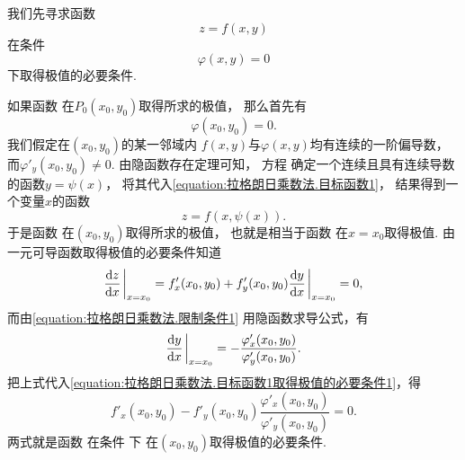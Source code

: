 我们先寻求函数
\begin{equation}\label{equation:拉格朗日乘数法.目标函数1}
	z=f(x,y)
\end{equation}
在条件
\begin{equation}\label{equation:拉格朗日乘数法.限制条件1}
	\varphi(x,y)=0
\end{equation}
下取得极值的必要条件.

如果函数 
在\(P_0(x_0,y_0)\)取得所求的极值，
那么首先有
\begin{equation}\label{equation:拉格朗日乘数法.限制条件1在P0}
	\varphi(x_0,y_0)=0.
\end{equation}
我们假定在\((x_0,y_0)\)的某一邻域内
\(f(x,y)\)与\(\varphi(x,y)\)均有连续的一阶偏导数，
而\(\varphi'_y(x_0,y_0)\neq0\).
由隐函数存在定理可知，
方程 
确定一个连续且具有连续导数的函数\(y=\psi(x)\)，
将其代入\cref{equation:拉格朗日乘数法.目标函数1}，
结果得到一个变量\(x\)的函数
\begin{equation}\label{equation:拉格朗日乘数法.目标函数1.代入限制条件1}
	z=f(x,\psi(x)).
\end{equation}
于是函数  在\((x_0,y_0)\)取得所求的极值，
也就是相当于函数  在\(x=x_0\)取得极值.
由一元可导函数取得极值的必要条件知道
\begin{equation}\label{equation:拉格朗日乘数法.目标函数1取得极值的必要条件1}
	\dv{z}{x}\eval_{x=x_0}
	= f'_x(x_0,y_0) + f'_y(x_0,y_0) \dv{y}{x}\eval_{x=x_0}
	= 0,
\end{equation}
而由\cref{equation:拉格朗日乘数法.限制条件1} 用隐函数求导公式，有\[
	\dv{y}{x}\eval_{x=x_0}
	= -\frac{\varphi'_x(x_0,y_0)}{\varphi'_y(x_0,y_0)}.
\]
把上式代入\cref{equation:拉格朗日乘数法.目标函数1取得极值的必要条件1}，得
\begin{equation}\label{equation:拉格朗日乘数法.目标函数1取得极值的必要条件2}
	f'_x(x_0,y_0) - f'_y(x_0,y_0) \frac{\varphi'_x(x_0,y_0)}{\varphi'_y(x_0,y_0)}
	= 0.
\end{equation}
两式就是函数 
在条件  下
在\((x_0,y_0)\)取得极值的必要条件.

